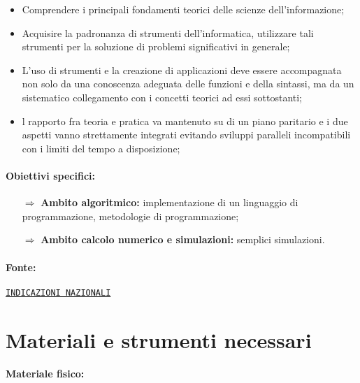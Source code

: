 \begin{itemize}
    \item Comprendere i principali
    fondamenti teorici delle scienze dell’informazione;
    \item Acquisire la padronanza di strumenti
    dell’informatica, utilizzare tali strumenti per la soluzione di problemi significativi in generale;
    \item L'uso di strumenti e la creazione di applicazioni deve essere accompagnata non solo da una
    conoscenza adeguata delle funzioni e della sintassi, ma da un sistematico collegamento con i
    concetti teorici ad essi sottostanti;
    \item l rapporto fra teoria e pratica va mantenuto
    su di un piano paritario e i due aspetti vanno strettamente integrati evitando sviluppi paralleli
    incompatibili con i limiti del tempo a disposizione;
\end{itemize}

\paragraph{Obiettivi specifici:}

\begin{itemize}
    \item [$\Rightarrow$] \textbf{Ambito algoritmico:}  implementazione di un linguaggio di programmazione, metodologie di programmazione;
    \item [$\Rightarrow$] \textbf{Ambito calcolo numerico e simulazioni:} semplici simulazioni.
\end{itemize}

\paragraph{Fonte:} \href{https://www.istruzione.it/alternanza/allegati/NORMATIVA%20ASL/INDICAZIONI%20NAZIONALI%20PER%20I%20LICEI.pdf}{\texttt{INDICAZIONI NAZIONALI}}

\pagebreak

\section{Materiali e strumenti necessari}

\paragraph{Materiale fisico:}

